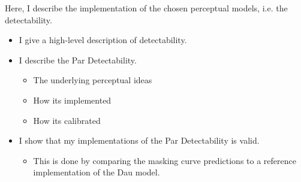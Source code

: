 Here, I describe the implementation of the chosen perceptual models, i.e. the detectability.
\begin{itemize}
    \item I give a high-level description of detectability. 
    \item I describe the Par Detectability.
        \begin{itemize}
            \item The underlying perceptual ideas
            \item How its implemented
            \item How its calibrated
        \end{itemize}
        \item I show that my implementations of the Par Detectability is valid.
            \begin{itemize}
                \item This is done by comparing the masking curve predictions to a reference implementation
                    of the Dau model.
            \end{itemize}
\end{itemize}
